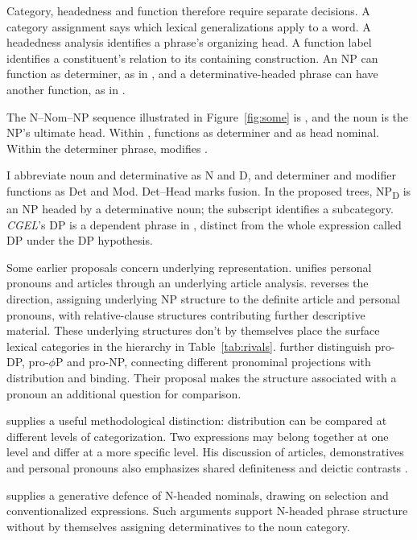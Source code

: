 \documentclass[12pt]{article}
\begin{document}
Category, headedness and function therefore require separate decisions. A category assignment says which lexical generalizations apply to a word. A headedness analysis identifies a phrase's organizing head. A function label identifies a constituent's relation to its containing construction. An NP can function as determiner, as in , and a determinative-headed phrase can have another function, as in  \citep{payne2010,pullummiller2022nps}.

The N--Nom--NP sequence illustrated in Figure~\ref{fig:some} is , and the noun is the NP's ultimate head. Within ,  functions as determiner and  as head nominal. Within the determiner phrase,  modifies .

I abbreviate noun and determinative as N and D, and determiner and modifier functions as Det and Mod. Det--Head marks fusion. In the proposed trees, NP\textsubscript{D} is an NP headed by a determinative noun; the subscript identifies a subcategory. \textit{CGEL}'s DP is a dependent phrase in , distinct from the whole expression called DP under the DP hypothesis.

Some earlier proposals concern underlying representation. \textcite{postal1966} unifies personal pronouns and articles through an underlying article analysis. \textcite[197--203]{sommerstein1972} reverses the direction, assigning underlying NP structure to the definite article and personal pronouns, with relative-clause structures contributing further descriptive material. These underlying structures don't by themselves place the surface lexical categories in the hierarchy in Table~\ref{tab:rivals}. \textcite{dechainewiltschko2002} further distinguish pro-DP, pro-$\phi$P and pro-NP, connecting different pronominal projections with distribution and binding. Their proposal makes the structure associated with a pronoun an additional question for comparison.

\textcite[232--235]{lyons1968} supplies a useful methodological distinction: distribution can be compared at different levels of categorization. Two expressions may belong together at one level and differ at a more specific level. His discussion of articles, demonstratives and personal pronouns also emphasizes shared definiteness and deictic contrasts \citep[279]{lyons1968}.

\textcite{bruening2020nominal} supplies a generative defence of N-headed nominals, drawing on selection and conventionalized expressions. Such arguments support N-headed phrase structure without by themselves assigning determinatives to the noun category.
\end{document}
